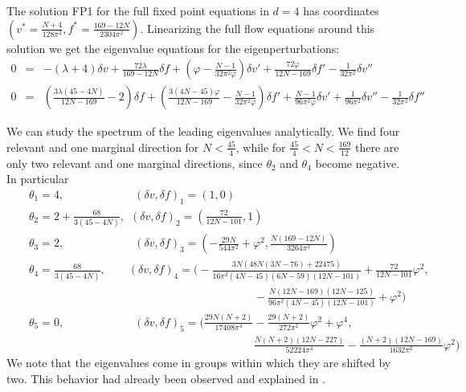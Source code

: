\documentclass[a4paper,11pt]{revtex4}
\newcommand{\bea}{\begin{eqnarray}}
\newcommand{\eea}{\end{eqnarray}}
\newcommand{\nn}{\nonumber}
\begin{document}
The solution FP1 for the full fixed point equations in $d=4$
has coordinates 
$\left(v^*=\frac{N+4}{128 \pi ^2},
f^*=\frac{169-12 N}{2304 \pi ^2}\right)$.
Linearizing the full flow equations around this solution
we get the eigenvalue equations for the eigenperturbations:
\bea
0&=& 
-(\lambda +4)\delta v 
+\frac{72\lambda}{169\!-\!12 N}\delta \!f
+ \left(\varphi-\frac{N-1}{32\pi^2\varphi}\right)\delta v'
+\frac{72\varphi}{12N\!-\!169}\delta\!f'-\frac{1}{32\pi^2}\delta v''  \\
0&=& \left(\frac{3\lambda(45-4N)}{12N\!-\!169}-2\right)\delta\!f
+\left(\frac{3(4N\!-\!45)\varphi}{12N-169}
-\frac{N-1}{32\pi^2\varphi}\right)\delta\!f'
+\frac{N-1}{96\pi^2\varphi}\delta v'
+\frac{1}{96\pi^2}\delta v''
-\frac{1}{32\pi^2}\delta\!f''
\nonumber
\eea


We can study the spectrum of the leading eigenvalues analytically. We find four relevant and one marginal direction for $N<\frac{45}{4}$, while for $\frac{45}{4}<N<\frac{169}{12}$ there are only two relevant and one marginal directions,
since $\theta_2$ and $\theta_4$ become negative. In particular
\bea
&{}&\theta_1=4 , \qquad \qquad  \qquad \ (\delta v,\delta\! f)_1 = (1,0) \\
&{}&\theta_2=2\!+\!\frac{68}{3 (45\!-\!4N)} , \ \  
(\delta v,\delta\! f)_2 = \left(\frac{72}{12 N\!-\!101}, 1\right) \nonumber\\
&{}&\theta_3=2 , \qquad\qquad\qquad\ 
(\delta v,\delta\! f)_3 = 
\left(-\frac{29 N}{544\pi^2}+\varphi^2,
\frac{N(169\!-\!12 N)}{3264\pi^2}\right)
\nonumber\\
&{}&\theta_4=\frac{68}{3 (45\!-\!4N)} ,\quad\quad
(\delta v,\delta\! f)_4
=\bigg(-\frac{3N(48N(3 N\!-\!76)+22475)}{16\pi^2(4N\!-\!45)(6N\!-\!59) (12N\!-\!101)}+\frac{72}{12N\!-\! 101}\varphi^2,
\nn
\\
&&
\qquad\qquad\qquad\qquad\qquad\qquad\qquad 
\qquad\qquad\qquad 
-\frac{N(12N\!-\!169)(12N-125)}
{96\pi^2(4N\!-\!45)(12 N\!-\!101)}+\varphi^2\bigg)
\nonumber\\
&{}&\theta_5=0 , \qquad  \qquad \qquad \ (\delta v,\delta\! f)_5 
=\bigg(\frac{29 N (N+2)}{17408\pi^4}-\frac{29(N+2)}{272\pi ^2}\varphi^2+\varphi^4,
\nn\\
&&
\qquad\qquad\qquad\qquad\qquad\qquad\qquad 
\qquad\qquad\qquad 
\frac{N (N+2) (12 N\!-\!227)}{52224\pi ^4}-\frac{(N+2) (12 N\!-\!169) }{1632\pi^2}\varphi^2\bigg)
\nonumber
\eea
We note that the eigenvalues come in groups
within which they are shifted by two.
This behavior had already been observed and
explained in \cite{narain1}.
%
%
%
%
\end{document}
